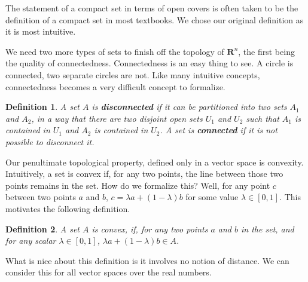 \documentclass[12pt]{amsbook}
\theoremstyle{plain}
\newtheorem{definition}{Definition}
\theoremstyle{definition}
\begin{document}
The statement of a compact set in terms of open covers is often taken to be the definition of a compact set in most textbooks. We chose our original definition as it is most intuitive.

We need two more types of sets to finish off the topology of $\mathbf{R}^n$, the first being the quality of connectedness. Connectedness is an easy thing to see. A circle is connected, two separate circles are not. Like many intuitive concepts, connectedness becomes a very difficult concept to formalize.

\begin{definition}
  A set $A$ is {\bf disconnected} if it can be partitioned into two sets $A_1$ and $A_2$, in a way that there are two disjoint open sets $U_1$ and $U_2$ such that $A_1$ is contained in $U_1$ and $A_2$ is contained in $U_2$. A set is {\bf connected} if it is not possible to disconnect it.
\end{definition}

Our penultimate topological property, defined only in a vector space is convexity. Intuitively, a set is convex if, for any two points, the line between those two points remains in the set. How do we formalize this? Well, for any point $c$ between two points $a$ and $b$, $c = \lambda a + (1 - \lambda)b$ for some value $\lambda \in [0,1]$. This motivates the following definition.

\begin{definition}
  A set $A$ is convex, if, for any two points $a$ and $b$ in the set, and for any scalar $\lambda \in [0,1]$, $\lambda a + (1 - \lambda) b \in A$.
\end{definition}

What is nice about this definition is it involves no notion of distance. We can consider this for all vector spaces over the real numbers.
\end{document}
